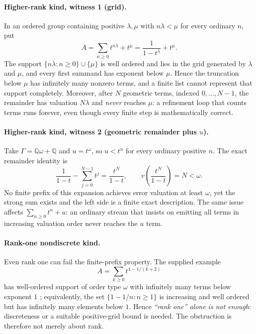 \documentclass[11pt,letterpaper]{article}
\numberwithin{equation}{section}
\theoremstyle{definition}
\theoremstyle{remark}
\newcommand{\Q}{\mathbb Q}
\begin{document}
\paragraph{Higher-rank kind, witness 1 (grid).}
In an ordered group containing positive $\lambda,\mu$ with $n\lambda<\mu$ for
every ordinary $n$, put
\begin{equation}\label{cas:eq-cutoff}
 A=\sum_{n\ge0}t^{n\lambda}+t^\mu=\frac1{1-t^\lambda}+t^\mu .
\end{equation}
The support $\{n\lambda:n\ge0\}\cup\{\mu\}$ is well ordered and lies in the grid
generated by $\lambda$ and $\mu$, and every first summand has exponent below
$\mu$. Hence the truncation below $\mu$ has infinitely many nonzero terms, and a
finite list cannot represent that support completely. Moreover, after $N$
geometric terms, indexed $0,\dots,N-1$, the remainder has valuation $N\lambda$
and \emph{never}
reaches $\mu$: a refinement loop that counts terms runs forever, even though
every finite step is mathematically correct.

\paragraph{Higher-rank kind, witness 2 (geometric remainder plus $u$).}
Take $\Gamma=\Q\omega+\Q$ and $u=t^\omega$, so $u<t^n$ for every ordinary
positive $n$. The exact remainder identity is
\begin{equation}\label{cas:eq-geometricremainder}
 \frac1{1-t}-\sum_{j=0}^{N-1}t^j=\frac{t^N}{1-t},
 \qquad v\!\left(\frac{t^N}{1-t}\right)=N<\omega .
\end{equation}
No finite prefix of this expansion achieves error valuation at least $\omega$,
yet the strong sum exists and the left side is a finite exact description. The
same issue affects $\sum_{n\ge0}t^n+u$: an ordinary stream that insists on
emitting all terms in increasing valuation order never reaches the $u$ term.

\paragraph{Rank-one nondiscrete kind.}
Even rank one can fail the finite-prefix property. The supplied example
\begin{equation}\label{cas:eq-accumulating}
 A=\sum_{k\ge0}t^{1-1/(k+2)}
\end{equation}
has well-ordered support of order type $\omega$ with infinitely many terms below
exponent $1$ \cite{cas:SourcePolynomial,cas:SourceResearch}; equivalently, the
set $\{1-1/n:n\ge1\}$ is increasing and well ordered but has infinitely many
elements below $1$. Hence \emph{``rank one'' alone is not enough}: discreteness
or a suitable positive-grid bound is needed. The obstruction is therefore not
merely about rank.
\end{document}

